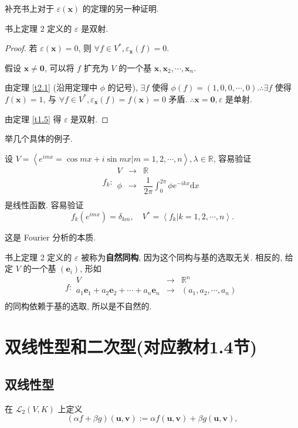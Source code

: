 \documentclass{ctexart}
\begin{document}
补充书上对于 $\varepsilon(\boldsymbol{x})$ 的定理的另一种证明.
\begin{theorem}
    书上定理 2 定义的 $\varepsilon$ 是双射.
\end{theorem}
\begin{proof}
    若 $\varepsilon(\boldsymbol{x})=0$, 则 $\forall f\in V^*,\varepsilon_{\boldsymbol{x}}(f)=0$.

    假设 $\boldsymbol{x}\neq\boldsymbol{0}$, 可以将 $f$ 扩充为 $V$ 的一个基 $\boldsymbol{x},\boldsymbol{x}_2,\cdots,\boldsymbol{x}_n$.
    
    由定理 \ref{t2.1} (沿用定理中 $\phi$ 的记号), $\exists f$ 使得 $\phi(f)=(1,0,0,\cdots,0).\therefore\exists f$ 使得 $f(\boldsymbol{x})=1$, 与 $\forall f\in V^*,\varepsilon_{\boldsymbol{x}}(f)=f(\boldsymbol{x})=0$ 矛盾. $\therefore\boldsymbol{x}=\boldsymbol{0},\varepsilon$ 是单射.

    由定理 \ref{t1.5} 得 $\varepsilon$ 是双射.
\end{proof}
举几个具体的例子.
\begin{example}
    设 $V=\left<e^{imx}=\cos mx+i\sin mx|m=1,2,\cdots,n\right>,\lambda\in\mathbb{R}$, 
    容易验证
    \[f_k:\begin{array}{rcl}
        V & \to & \mathbb{R} \\
        \phi & \to & \dfrac{1}{2\pi}\int_0^{2\pi}\phi e^{-ikx}\mathrm{d}x \\
    \end{array}\]
    是线性函数. 容易验证
    \[f_k(e^{imx})=\delta_{km},\quad V^*=\left<f_k|k=1,2,\cdots,n\right>.\]

    这是 Fourier 分析的本质.
\end{example}
书上定理 2 定义的 $\varepsilon$ 被称为\textbf{自然同构}, 因为这个同构与基的选取无关. 相反的, 给定 $V$ 的一个基 $(\boldsymbol{e}_i)$, 形如
\[f:\begin{array}{rcl}
    V & \to & \mathbb{R}^n \\
    a_1\boldsymbol{e}_1+a_2\boldsymbol{e}_2+\cdots+a_n\boldsymbol{e}_n & \to & (a_1,a_2,\cdots,a_n) \\
\end{array}\]
的同构依赖于基的选取, 所以是不自然的.
\section{双线性型和二次型(对应教材1.4节)}
\subsection{双线性型}
在 $\mathcal{L}_2(V,K)$ 上定义
\[(\alpha f+\beta g)(\boldsymbol{u},\boldsymbol{v}):=\alpha f(\boldsymbol{u},\boldsymbol{v})+\beta g(\boldsymbol{u},\boldsymbol{v}),\]
\end{document}
